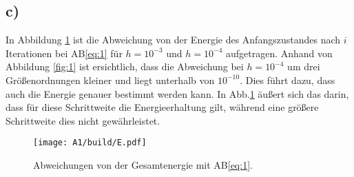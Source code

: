 \FloatBarrier

\subsection*{c)}
In Abbildung \ref{fig:3} ist die Abweichung von der Energie des Anfangszustandes nach $i$ Iterationen bei AB\eqref{eq:1} für $h=10^{-3}$ und $h=10^{-4}$ aufgetragen.
Anhand von Abbildung \ref{fig:1} ist ersichtlich, dass die Abweichung bei $h=10^{-4}$ um drei Größenordnungen kleiner und liegt unterhalb von $10^{-10}$. Dies führt dazu, dass auch die Energie genauer bestimmt werden kann. In Abb.\ref{fig:3} äußert sich das darin, dass für diese Schrittweite die Energieerhaltung gilt, während eine größere Schrittweite dies nicht gewährleistet.
\begin{figure}[h]
\texttt{[image: A1/build/E.pdf]}
\caption{Abweichungen von der Gesamtenergie mit AB\eqref{eq:1}.}
\label{fig:3}
\end{figure}